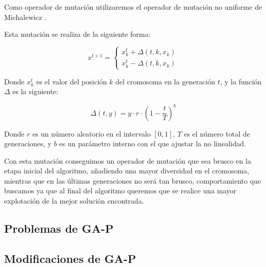 Como operador de mutación utilizaremos el operador de mutación no uniforme de Michalewicz \cite{mutacionMichalewicz}.

Esta mutación se realiza de la siguiente forma:

\[ x^{t + 1} =
	\begin{cases}
		x_k^t + \Delta(t, k, x_k)\\
		x_k^t - \Delta(t, k, x_k)
	\end{cases}
\]

Donde $x_k^t$ es el valor del posición $k$ del cromosoma en la generación $t$, y la función $\Delta$ es la siguiente:

$$ \Delta(t, y) = y \cdot r \cdot (1 - \frac{t}{T})^b $$

Donde $r$ es un número aleatorio en el intervalo $[0, 1]$, $T$ es el número total de generaciones, y $b$ es un parámetro interno con el que ajustar la no linealidad.

Con esta mutación conseguimos un operador de mutación que sea brusco en la etapa inicial del algoritmo, añadiendo una mayor diversidad en el cromosoma, mientras que en las últimas generaciones no será tan brusco, comportamiento que buscamos ya que al final del algoritmo queremos que se realice una mayor explotación de la mejor solución encontrada. 

\subsection{Problemas de GA-P}

\subsection{Modificaciones de GA-P}
